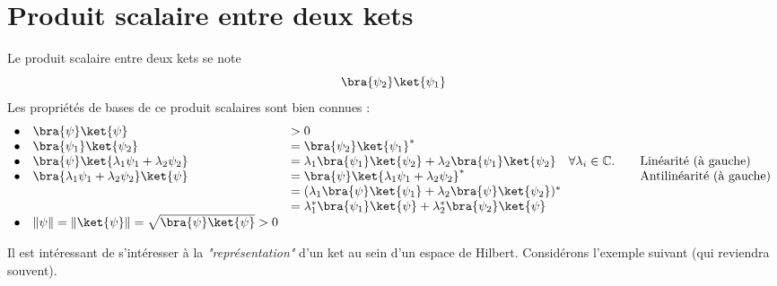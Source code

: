 \section{Produit scalaire entre deux kets}
Le produit scalaire entre deux kets se note
\begin{equation}
\bra{\psi_2}\ket{\psi_1}
\end{equation}
\newpage
Les propriétés de bases de ce produit scalaires sont bien connues :
\begin{equation}
\begin{array}{llll}
\bullet & \bra{\psi}\ket{\psi} &> 0\\
\bullet & \bra{\psi_1}\ket{\psi_2} &= \bra{\psi_2}\ket{\psi_1}^*\\
\bullet & \bra{\psi}\ket{\lambda_1\psi_1+\lambda_2\psi_2} &= \lambda_1\bra{\psi_1}\ket{\psi_2}
+\lambda_2\bra{\psi_1}\ket{\psi_2}\quad \forall \lambda_i\in\mathbb{C}.\quad
& \text{Linéarité (à gauche)}\\
\bullet & \bra{\lambda_1\psi_1+\lambda_2\psi_2}\ket{\psi} &= \bra{\psi}\ket{\lambda_1
\psi_1+\lambda_2\psi_2}^* \quad & \text{Antilinéarité (à gauche)}\\
&  &= (\lambda_1\bra{\psi}\ket{\psi_1}+\lambda_2\bra{\psi}\ket{\psi_2})^*\\
&  &= \lambda_1^*\bra{\psi_1}\ket{\psi} +  \lambda_2^*\bra{\psi_2}\ket{\psi}\\
\bullet & \|\psi\| = \|\ket{\psi}\| = \sqrt{\bra{\psi}\ket{\psi}}>0
\end{array}
\end{equation}

Il est intéressant de s'intéresser à la \textit{"représentation"} d'un ket au sein 
d'un espace de Hilbert. Considérons l’exemple suivant (qui reviendra souvent).\\

